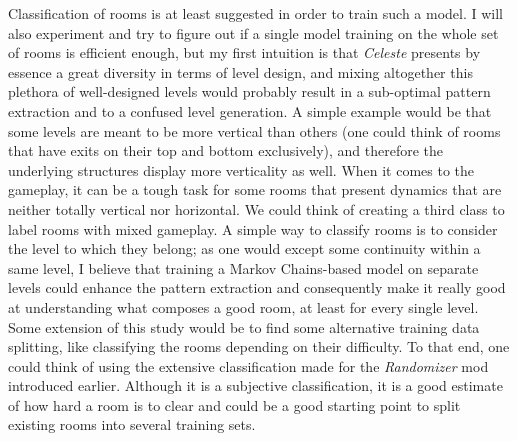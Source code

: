 \documentclass{article}
\newcommand{\Celeste}{\textit{Celeste} }
\begin{document}
\noindent Classification of rooms is at least suggested in order to train such a model. I will also experiment and try to figure out if a single model training on the whole set of rooms is efficient enough, but my first intuition is that \Celeste presents by essence a great diversity in terms of level design, and mixing altogether this plethora of well-designed levels would probably result in a sub-optimal pattern extraction and to a confused level generation. A simple example would be that some levels are meant to be more vertical than others (one could think of rooms that have exits on their top and bottom exclusively), and therefore the underlying structures display more verticality as well. When it comes to the gameplay, it can be a tough task for some rooms that present dynamics that are neither totally vertical nor horizontal. We could think of creating a third class to label rooms with mixed gameplay. A simple way to classify rooms is to consider the level to which they belong; as one would except some continuity within a same level, I believe that training a Markov Chains-based model on separate levels could enhance the pattern extraction and consequently make it really good at understanding what composes a good room, at least for every single level. Some extension of this study would be to find some alternative training data splitting, like classifying the rooms depending on their difficulty. To that end, one could think of using the extensive classification made for the \textit{Randomizer} mod introduced earlier. Although it is a subjective classification, it is a good estimate of how hard a room is to clear and could be a good starting point to split existing rooms into several training sets.
\end{document}
